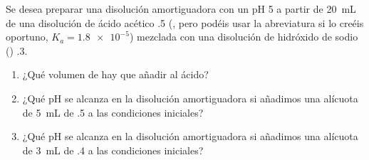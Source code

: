 Se desea preparar una disolución amortiguadora con un pH 5 a partir de \SI{20}{\milli\liter} de una disolución de ácido acético \SI{,5}{\Molar} (, pero podéis usar la abreviatura  si lo creéis oportuno, $K_a = \num{1,8e-5}$) mezclada con una disolución de hidróxido de sodio () \SI{,3}{\Molar}.
\begin{enumerate}[label={\alph*)},font={\color{red!50!black}\bfseries}]
	\item ¿Qué volumen de  hay que añadir al ácido?
	\item ¿Qué pH se alcanza en la disolución amortiguadora si añadimos una alícuota de \SI{5}{\milli\liter} de  \SI{,5}{\Molar} a las condiciones iniciales?
	\item ¿Qué pH se alcanza en la disolución amortiguadora si añadimos una alícuota de \SI{3}{\milli\liter} de  \SI{,4}{\Molar} a las condiciones iniciales?
\end{enumerate}
